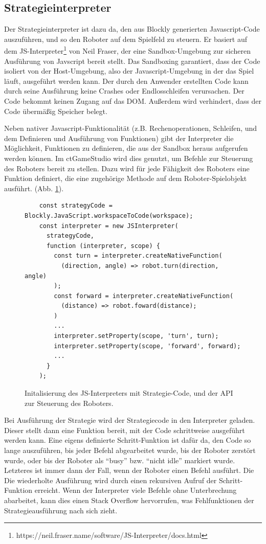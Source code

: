 \subsection{Strategieinterpreter}

Der Strategieinterpreter ist dazu da, den aus Blockly generierten Javascript-Code auszuführen, und
so den Roboter auf dem Spielfeld zu steuern. Er basiert auf dem
JS-Interpreter\footnote{https://neil.fraser.name/software/JS-Interpreter/docs.html} von Neil Fraser,
der eine Sandbox-Umgebung zur sicheren Ausführung von Javscript bereit stellt. Das Sandboxing
garantiert, dass der Code isoliert von der Host-Umgebung, also der Javascript-Umgebung in der das
Spiel läuft, ausgeführt werden kann. Der durch den Anwender erstellten Code kann durch seine
Ausführung keine Crashes oder Endlosschleifen verursachen. Der Code bekommt keinen Zugang auf das
DOM. Außerdem wird verhindert, dass der Code übermäßig Speicher belegt.

Neben nativer Javascript-Funktionalität (z.B. Rechenoperationen, Schleifen, und dem Definieren und
Ausführung von Funktionen) gibt der Interpreter die Möglichkeit, Funktionen zu definieren, die aus
der Sandbox heraus aufgerufen werden können. Im ctGameStudio wird dies genutzt, um Befehle zur
Steuerung des Roboters bereit zu stellen. Dazu wird für jede Fähigkeit des Roboters eine Funktion
definiert, die eine zugehörige Methode auf dem Roboter-Spielobjekt ausführt. (Abb.
\ref{js-interpreter-init}).

\begin{figure}
  \caption{Initalisierung des JS-Interpreters mit Strategie-Code, und der API zur Steuerung des
  Roboters.}

  \label{js-interpreter-init}

  \begin{lstlisting}
    const strategyCode = Blockly.JavaScript.workspaceToCode(workspace);
    const interpreter = new JSInterpreter(
      strategyCode,
      function (interpreter, scope) {
        const turn = interpreter.createNativeFunction(
          (direction, angle) => robot.turn(direction, angle)
        );
        const forward = interpreter.createNativeFunction(
          (distance) => robot.foward(distance);
        )
        ...
        interpreter.setProperty(scope, 'turn', turn);
        interpreter.setProperty(scope, 'forward', forward);
        ...
      }
    );
  \end{lstlisting}
\end{figure}

Bei Ausführung der Strategie wird der Strategiecode in den Interpreter geladen. Dieser stellt dann
eine Funktion bereit, mit der Code schrittweise ausgeführt werden kann. Eine eigens definierte
Schritt-Funktion ist dafür da, den Code so lange auszuführen, bis jeder Befehl abgearbeitet wurde,
bis der Roboter zerstört wurde, oder bis der Roboter als \enquote{busy} bzw. \enquote{nicht idle}
markiert wurde. Letzteres ist immer dann der Fall, wenn der Roboter einen Befehl ausführt. Die
Die wiederholte Ausführung wird durch einen rekursiven Aufruf der Schritt-Funktion erreicht. Wenn der
Interpreter viele Befehle ohne Unterbrechung abarbeitet, kann dies einen Stack Overflow hervorrufen,
was Fehlfunktionen der Strategieausführung nach sich zieht.

